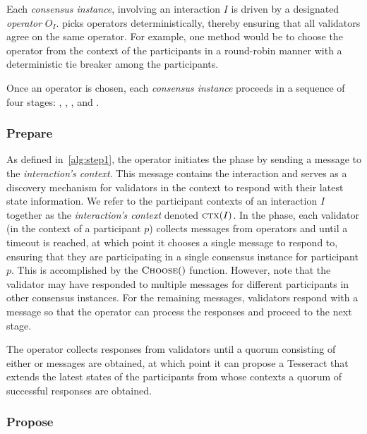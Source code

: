 Each \textit{consensus instance}, involving an interaction $I$ is driven by a designated \emph{operator} $O_I$. \codename{} picks operators deterministically, thereby ensuring that all validators agree on the same operator. For example, one method would be to choose the operator from the context of the participants in a round-robin manner with a deterministic tie breaker among the participants.

Once an operator is chosen, each \textit{consensus instance} proceeds in a sequence of four stages: , , , and .


\subsubsection{Prepare}

As defined in~\cref{alg:step1}, the operator initiates the  phase by sending a  message to the \emph{interaction's context}. This message contains the interaction and serves as a discovery mechanism for validators in the context to respond with their latest state information. We refer to the participant contexts of an interaction $I$ together as the \emph{interaction's context} denoted $\mathrm{\textsc{ctx}}(I)$. In the  phase, each validator (in the context of a participant $p$) collects  messages from operators and until a timeout is reached, at which point it chooses a single  message to respond to, ensuring that they are participating in a single consensus instance for participant $p$. This is accomplished by the $\mathrm{\textsc{Choose}}()$ function. However, note that the validator may have responded to multiple  messages for different participants in other consensus instances. 
For the remaining  messages, validators respond with a  message so that the operator can process the responses and proceed to the next stage.

The operator collects responses from validators until a quorum consisting of either  or  messages are obtained, at which point it can propose a Tesseract that extends the latest states of the participants from whose contexts a quorum of successful  responses are obtained. 


\subsubsection{Propose}

